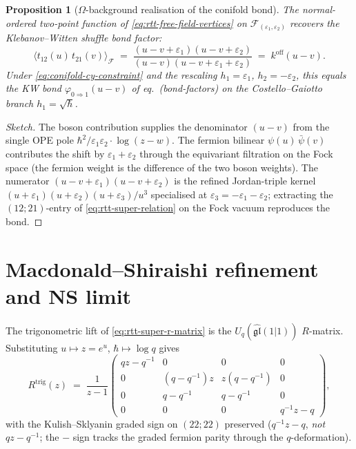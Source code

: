 \documentclass[11pt]{amsart}
\newtheorem{proposition}[theorem]{Proposition}
\theoremstyle{definition}
\providecommand{\cF}{\mathcal{F}}
\providecommand{\fgl}{\mathfrak{gl}}
\begin{document}
\begin{proposition}[$\Omega$-background realisation of the conifold bond]
\label{prop:omega-bond-RTT}
The normal-ordered two-point function of \eqref{eq:rtt-free-field-vertices} on
$\cF_{(\varepsilon_1, \varepsilon_2)}$ recovers the Klebanov--Witten
shuffle bond factor:
\[
  \bigl\langle t_{12}(u)\, t_{21}(v) \bigr\rangle_{\cF}
  \;=\;
  \frac{(u - v + \varepsilon_1)(u - v + \varepsilon_2)}
       {(u - v)(u - v + \varepsilon_1 + \varepsilon_2)}
  \;=\;
  k^{\mathrm{off}}(u - v).
\]
Under \eqref{eq:conifold-cy-constraint} and the rescaling
$h_1 = \varepsilon_1$, $h_2 = -\varepsilon_2$, this equals the KW bond
$\varphi_{0 \Rightarrow 1}(u - v)$ of eq.~(\emph{bond-factors}) on the
Costello--Gaiotto branch $h_1 = \sqrt{\hbar}$.
\end{proposition}

\begin{proof}[Sketch]
The boson contribution supplies the denominator $(u - v)$ from the
single OPE pole $\hbar^2/\varepsilon_1\varepsilon_2 \cdot \log(z-w)$.
The fermion bilinear $\psi(u)\, \bar\psi(v)$ contributes the shift by
$\varepsilon_1 + \varepsilon_2$ through the equivariant filtration on
the Fock space (the fermion weight is the difference of the two boson
weights). The numerator
$(u - v + \varepsilon_1)(u - v + \varepsilon_2)$ is the refined
Jordan-triple kernel $(u + \varepsilon_1)(u + \varepsilon_2)(u +
\varepsilon_3)/u^3$ specialised at
$\varepsilon_3 = -\varepsilon_1 - \varepsilon_2$; extracting the
$(12; 21)$-entry of \eqref{eq:rtt-super-relation} on the Fock vacuum reproduces
the bond.
\end{proof}

\section{Macdonald--Shiraishi refinement and NS limit}
\label{sec:MS-refinement}

The trigonometric lift of \eqref{eq:rtt-super-r-matrix} is the
$U_q(\widehat{\fgl}(1|1))$ $R$-matrix. Substituting $u \mapsto z = e^u$,
$\hbar \mapsto \log q$ gives
\begin{equation}\label{eq:rtt-trig-super-r}
  R^{\mathrm{trig}}(z)
  \;=\;
  \frac{1}{z - 1}
  \begin{pmatrix}
    qz - q^{-1} & 0 & 0 & 0 \\
    0 & (q - q^{-1}) z & z(q - q^{-1}) & 0 \\
    0 & q - q^{-1} & q - q^{-1} & 0 \\
    0 & 0 & 0 & q^{-1} z - q
  \end{pmatrix},
\end{equation}
with the Kulish--Sklyanin graded sign on $(22; 22)$ preserved
($q^{-1} z - q$, \emph{not} $q z - q^{-1}$; the $-$ sign tracks the
graded fermion parity through the $q$-deformation).
\end{document}
